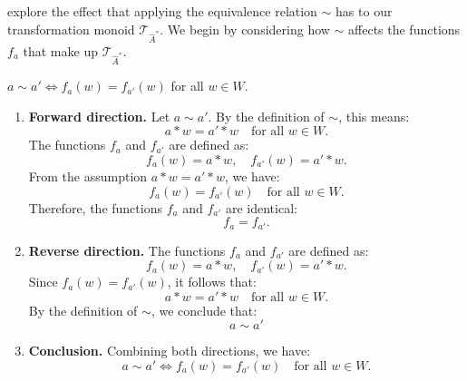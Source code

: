  explore the effect that applying the equivalence relation $\sim$ has to our transformation monoid $\mathcal{T}_{\hat{A}^{*}}$.
We begin by considering how $\sim$ affects the functions $f_{a}$ that make up $\mathcal{T}_{\hat{A}^{*}}$.

\begin{propositionE}
\label{prp:equivalence_relation_gives_equal_action_functions}
    $a \sim a' \iff f_{a}(w) = f_{a'}(w)$ for all $w \in W$.
\end{propositionE}
\begin{proofE}
\begin{enumerate}
    \item \textbf{Forward direction.}
    Let $a \sim a'$. By the definition of $\sim$, this means:
    \begin{equation}
        a \ast w = a' \ast w \quad \text{for all } w \in W.
    \end{equation}
    The functions $f_{a}$ and $f_{a'}$ are defined as:
    \begin{equation}
        f_{a}(w) = a \ast w, \quad f_{a'}(w) = a' \ast w.
    \end{equation}
    From the assumption $a \ast w = a' \ast w$, we have:
    \begin{equation}
        f_{a}(w) = f_{a'}(w) \quad \text{for all } w \in W.
    \end{equation}
    Therefore, the functions $f_{a}$ and $f_{a'}$ are identical:
    \begin{equation}
        f_{a} = f_{a'}.
    \end{equation}

    \item \textbf{Reverse direction.}
    The functions $f_{a}$ and $f_{a'}$ are defined as:
    \begin{equation}
        f_{a}(w) = a \ast w, \quad f_{a'}(w) = a' \ast w.
    \end{equation}
    Since $f_{a}(w) = f_{a'}(w)$, it follows that:
    \begin{equation}
        a \ast w = a' \ast w \quad \text{for all } w \in W.
    \end{equation}
    By the definition of $\sim$, we conclude that:
    \begin{equation}
        a \sim a'
    \end{equation}

    \item \textbf{Conclusion.}
    Combining both directions, we have:
    \begin{equation}
        a \sim a' \iff f_{a}(w) = f_{a'}(w) \quad \text{for all } w \in W.
    \end{equation}
\end{enumerate}
\end{proofE}

